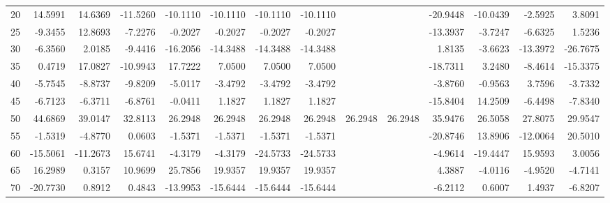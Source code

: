 \begin{tabular}{lrrrrrrrrrrrrr}
20  &         14.5991 &      14.6369 &    -11.5260 &       -10.1110 &      -10.1110 &      -10.1110 &      -10.1110 &               &               &  -20.9448 &    -10.0439 &    -2.5925 &        3.8091 \\
25  &         -9.3455 &      12.8693 &     -7.2276 &        -0.2027 &       -0.2027 &       -0.2027 &       -0.2027 &               &               &  -13.3937 &     -3.7247 &    -6.6325 &        1.5236 \\
30  &         -6.3560 &       2.0185 &     -9.4416 &       -16.2056 &      -14.3488 &      -14.3488 &      -14.3488 &               &               &    1.8135 &     -3.6623 &   -13.3972 &      -26.7675 \\
35  &          0.4719 &      17.0827 &    -10.9943 &        17.7222 &        7.0500 &        7.0500 &        7.0500 &               &               &  -18.7311 &      3.2480 &    -8.4614 &      -15.3375 \\
40  &         -5.7545 &      -8.8737 &     -9.8209 &        -5.0117 &       -3.4792 &       -3.4792 &       -3.4792 &               &               &   -3.8760 &     -0.9563 &     3.7596 &       -3.7332 \\
45  &         -6.7123 &      -6.3711 &     -6.8761 &        -0.0411 &        1.1827 &        1.1827 &        1.1827 &               &               &  -15.8404 &     14.2509 &    -6.4498 &       -7.8340 \\
50  &         44.6869 &      39.0147 &     32.8113 &        26.2948 &       26.2948 &       26.2948 &       26.2948 &       26.2948 &       26.2948 &   35.9476 &     26.5058 &    27.8075 &       29.9547 \\
55  &         -1.5319 &      -4.8770 &      0.0603 &        -1.5371 &       -1.5371 &       -1.5371 &       -1.5371 &               &               &  -20.8746 &     13.8906 &   -12.0064 &       20.5010 \\
60  &        -15.5061 &     -11.2673 &     15.6741 &        -4.3179 &       -4.3179 &      -24.5733 &      -24.5733 &               &               &   -4.9614 &    -19.4447 &    15.9593 &        3.0056 \\
65  &         16.2989 &       0.3157 &     10.9699 &        25.7856 &       19.9357 &       19.9357 &       19.9357 &               &               &    4.3887 &     -4.0116 &    -4.9520 &       -4.7141 \\
70  &        -20.7730 &       0.8912 &      0.4843 &       -13.9953 &      -15.6444 &      -15.6444 &      -15.6444 &               &               &   -6.2112 &      0.6007 &     1.4937 &       -6.8207 \\

\end{tabular}
